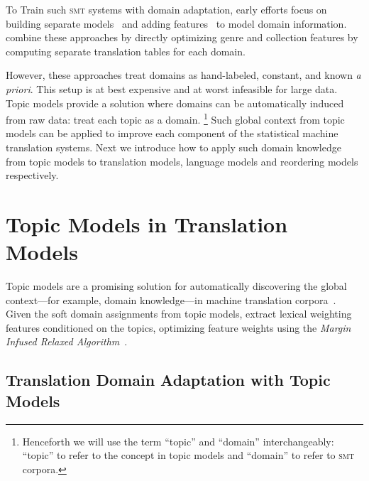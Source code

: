To Train such \textsc{smt} systems with domain adaptation, early efforts focus on building separate models~\citep{foster-07} and adding features~\citep{matsoukas-09} to model domain information.  \citet{chiang-11} combine these approaches by directly optimizing genre and collection features by computing separate translation tables for each domain.

However, these approaches treat domains as hand-labeled, constant, and known \textit{a priori}.  This setup is at best expensive and at worst infeasible for large data.  Topic models provide a solution where domains can be automatically induced from raw data: treat each topic as a domain. \footnote{Henceforth we will use the term ``topic'' and ``domain'' interchangeably: ``topic'' to refer to the concept in topic models and ``domain'' to refer to \textsc{smt} corpora.}
Such global context from topic models can be applied to improve each component of the statistical machine translation systems. Next we introduce how to apply such domain knowledge from topic models to translation models, language models and reordering models respectively.


\section{Topic Models in Translation Models}


Topic models are a promising solution for automatically discovering the global context---for example, domain knowledge---in machine translation corpora~\citep{Eidelman-12,hu-14}. Given the soft domain assignments from topic models, \citet{Eidelman-12} extract lexical weighting features conditioned on the topics, optimizing feature weights using the \emph{Margin Infused Relaxed Algorithm}~\citep[\textsc{mira}]{Crammer-06}.

\subsection{Translation Domain Adaptation with Topic Models}


